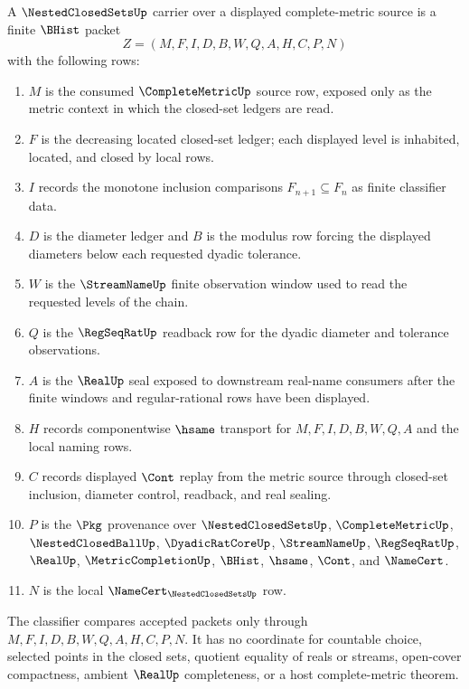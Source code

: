 \begin{definition}
\label{def:nested-closed-sets-carrier}
A $\NestedClosedSetsUp$ carrier over a displayed complete-metric source is a finite $\BHist$ packet
$$
Z=(M,F,I,D,B,W,Q,A,H,C,P,N)
$$
with the following rows:
\begin{enumerate}
\item $M$ is the consumed $\CompleteMetricUp$ source row, exposed only as the metric context in which the closed-set ledgers are read.
\item $F$ is the decreasing located closed-set ledger; each displayed level is inhabited, located, and closed by local rows.
\item $I$ records the monotone inclusion comparisons $F_{n+1}\subseteq F_n$ as finite classifier data.
\item $D$ is the diameter ledger and $B$ is the modulus row forcing the displayed diameters below each requested dyadic tolerance.
\item $W$ is the $\StreamNameUp$ finite observation window used to read the requested levels of the chain.
\item $Q$ is the $\RegSeqRatUp$ readback row for the dyadic diameter and tolerance observations.
\item $A$ is the $\RealUp$ seal exposed to downstream real-name consumers after the finite windows and regular-rational rows have been displayed.
\item $H$ records componentwise $\hsame$ transport for $M,F,I,D,B,W,Q,A$ and the local naming rows.
\item $C$ records displayed $\Cont$ replay from the metric source through closed-set inclusion, diameter control, readback, and real sealing.
\item $P$ is the $\Pkg$ provenance over $\NestedClosedSetsUp$, $\CompleteMetricUp$, $\NestedClosedBallUp$, $\DyadicRatCoreUp$, $\StreamNameUp$, $\RegSeqRatUp$, $\RealUp$, $\MetricCompletionUp$, $\BHist$, $\hsame$, $\Cont$, and $\NameCert$.
\item $N$ is the local $\NameCert_{\NestedClosedSetsUp}$ row.
\end{enumerate}
The classifier compares accepted packets only through $M,F,I,D,B,W,Q,A,H,C,P,N$. It has no coordinate for countable choice, selected points in the closed sets, quotient equality of reals or streams, open-cover compactness, ambient $\RealUp$ completeness, or a host complete-metric theorem.
\end{definition}

